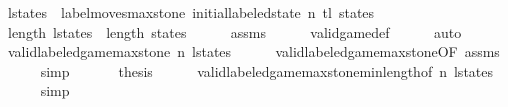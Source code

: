 \begin{isabellebody}
\ {\isacharquery}l{\isacharunderscore}states\ {\isacharequal}\ {\isachardoublequoteopen}label{\isacharunderscore}moves{\isacharunderscore}max{\isacharunderscore}stone\ {\isacharparenleft}initial{\isacharunderscore}labeled{\isacharunderscore}state\ n{\isacharparenright}\ {\isacharparenleft}tl\ states{\isacharparenright}{\isachardoublequoteclose}\isanewline
\ \ \isamarkupfalse%
\ {\isachardoublequoteopen}length\ {\isacharquery}l{\isacharunderscore}states\ {\isacharequal}\ length\ states{\isachardoublequoteclose}\isanewline
\ \ \ \ \isamarkupfalse%
\ assms\isanewline
\ \ \ \ \isamarkupfalse%
\ valid{\isacharunderscore}game{\isacharunderscore}def\isanewline
\ \ \ \ \isamarkupfalse%
\ auto\isanewline
\ \ \isamarkupfalse%
\isanewline
\ \ \isamarkupfalse%
\ {\isachardoublequoteopen}valid{\isacharunderscore}labeled{\isacharunderscore}game{\isacharunderscore}max{\isacharunderscore}stone\ n\ {\isacharquery}l{\isacharunderscore}states{\isachardoublequoteclose}\isanewline
\ \ \ \ \isamarkupfalse%
\ valid{\isacharunderscore}labeled{\isacharunderscore}game{\isacharunderscore}max{\isacharunderscore}stone{\isacharbrackleft}OF\ assms{\isacharbrackright}\isanewline
\ \ \ \ \isamarkupfalse%
\ simp\isanewline
\ \ \isamarkupfalse%
\isanewline
\ \ \isamarkupfalse%
\ {\isacharquery}thesis\isanewline
\ \ \ \ \isamarkupfalse%
\ valid{\isacharunderscore}labeled{\isacharunderscore}game{\isacharunderscore}max{\isacharunderscore}stone{\isacharunderscore}min{\isacharunderscore}length{\isacharbrackleft}of\ n\ {\isacharquery}l{\isacharunderscore}states{\isacharbrackright}\isanewline
\ \ \ \ \isamarkupfalse%
\ simp\isanewline
{}\isamarkupfalse%
%
\endisatagproof
{\isafoldproof}%
%
\isadelimproof
\isanewline
%
\endisadelimproof
%
\isadelimtheory
\isanewline
%
\endisadelimtheory
%
\isatagtheory
{}\isamarkupfalse%
%
\endisatagtheory
{\isafoldtheory}%
%
\isadelimtheory
%
\endisadelimtheory
%
\end{isabellebody}%
\endinput
